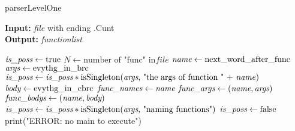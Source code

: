 \documentclass{article}
\begin{document}
\begin{algorithm}
    \caption{parserLevelOne}\label{alg:parserLevelOne}
    \textbf{Input:} \textit{file} with ending .Cunt\\
    \textbf{Output:} \textit{function\textunderscore list}
    \begin{algorithmic}
        \State $\textit{is\textunderscore poss} \gets \text{true}$
        \State $N \gets \text{number of "func" in} \textit{file}$
            \State $\textit{name} \gets \text{next\textunderscore word\textunderscore after\textunderscore func}$
            \State $\textit{args} \gets \text{evythg\textunderscore in\textunderscore brc}$
            \State $\textit{is\textunderscore poss} \gets \textit{is\textunderscore poss} * \text{isSingleton(\textit{args}, "the args of function " + \textit{name})}$
            \State $\textit{body} \gets \text{evythg\textunderscore in\textunderscore cbrc}$
            \State $\textit{func\textunderscore names} \gets \textit{name}$
            \State $\textit{func\textunderscore args} \gets (\textit{name},\textit{args})$
            \State $\textit{func\textunderscore bodys} \gets (\textit{name},\textit{body})$
        \EndFor
        \State $\textit{is\textunderscore poss} \gets \textit{is\textunderscore poss}*\text{isSingleton(\textit{args}, "naming functions")}$
            \State $\textit{is\textunderscore poss} \gets \text{false}$
            \State print("ERROR: no main to execute")
        \EndIf
    \end{algorithmic}
\end{algorithm}
\end{document}
